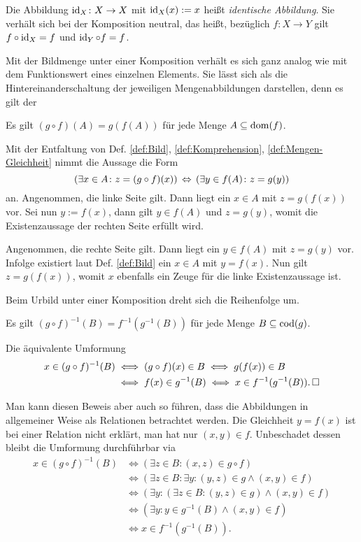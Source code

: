 \noindent
Die Abbildung $\operatorname{id}_X\colon X\to X$ mit $\operatorname{id}_X(x):=x$ heißt
\emph{identische Abbildung}. Sie verhält
sich bei der Komposition neutral, das heißt, bezüglich
$f\colon X\to Y$ gilt $f\circ\operatorname{id}_X = f$ und $\operatorname{id}_Y\circ f=f$.

Mit der Bildmenge unter einer Komposition verhält es sich ganz analog
wie mit dem Funktionswert eines einzelnen Elements. Sie lässt sich
als die Hintereinanderschaltung der jeweiligen Mengenabbildungen
darstellen, denn es gilt der

\begin{Satz}\label{Bild-unter-Komposition}
Es gilt $(g\circ f)(A) = g(f(A))$ für jede Menge $A\subseteq\operatorname{dom}(f)$.
\end{Satz}
\begin{Beweis}
Mit der Entfaltung von Def. \ref{def:Bild}, \ref{def:Komprehension},
\ref{def:Mengen-Gleichheit} nimmt die Aussage die Form
\[(\exists x\in A\colon z=(g\circ f)(x))\,\Leftrightarrow\,
(\exists y\in f(A)\colon z = g(y))\]
an. Angenommen, die linke Seite gilt. Dann liegt ein $x\in A$ mit
$z=g(f(x))$ vor. Sei nun $y:=f(x)$, dann gilt $y\in f(A)$ und $z=g(y)$,
womit die Existenzaussage der rechten Seite erfüllt wird.

Angenommen, die rechte Seite gilt. Dann liegt ein $y\in f(A)$ mit
$z=g(y)$ vor. Infolge existiert laut Def. \ref{def:Bild} ein $x\in A$ mit
$y=f(x)$. Nun gilt $z=g(f(x))$, womit $x$ ebenfalls ein Zeuge
für die linke Existenzaussage ist.\,\qedsymbol
\end{Beweis}

\noindent
Beim Urbild unter einer Komposition dreht sich die Reihenfolge um.
\begin{Satz}
Es gilt $(g\circ f)^{-1}(B) = f^{-1}(g^{-1}(B))$ für jede Menge
$B\subseteq\operatorname{cod}(g)$.
\end{Satz}
\begin{Beweis}
Die äquivalente Umformung
\begin{align*}
x\in (g\circ f)^{-1}(B) &\iff (g\circ f)(x)\in B \iff g(f(x))\in B\\
&\iff f(x)\in g^{-1}(B) \iff x\in f^{-1}(g^{-1}(B)).\,\Box
\end{align*}
\end{Beweis}

\noindent
Man kann diesen Beweis aber auch so führen, dass die Abbildungen in
allgemeiner Weise als Relationen betrachtet werden. Die Gleichheit
$y=f(x)$ ist bei einer Relation nicht erklärt, man hat nur $(x,y)\in f$.
Unbeschadet dessen bleibt die Umformung durchführbar via
\begin{align*}
x\in (g\circ f)^{-1}(B)
&\iff (\exists z\in B\colon (x,z)\in g\circ f)\\
&\iff (\exists z\in B\colon\exists y\colon (y,z)\in g \land (x,y)\in f)\\
&\iff (\exists y\colon (\exists z\in B\colon (y,z)\in g) \land (x,y)\in f)\\
&\iff (\exists y\colon y\in g^{-1}(B)\land (x,y)\in f)\\
&\iff x\in f^{-1}(g^{-1}(B)).
\end{align*}

